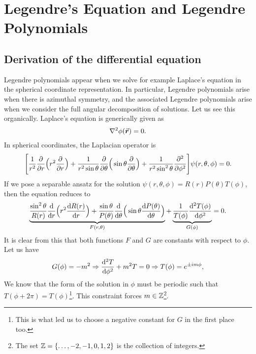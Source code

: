 \chapter{Legendre's Equation and Legendre Polynomials}


\section{Derivation of the differential equation}

Legendre polynomials appear when we solve for example Laplace's equation in the spherical coordinate representation.
In particular, Legendre polynomials arise when there is azimuthal symmetry, and the associated Legendre polynomials arise when we consider the full angular decomposition of solutions.
Let us see this organically.
Laplace's equation is generically given as
\begin{eqnarray}
    \laplacian \phi(\va*{r}) = 0
.\end{eqnarray}
In spherical coordinates, the Laplacian operator is
\begin{eqnarray}
    \Bigg[ \frac{1}{r^2} \pdv{r} \Big( r^2 \pdv{r} \Big) + \frac{1}{r^2 \sin{\theta}} \pdv{\theta} \Big( \sin{\theta} \pdv{\theta} \Big) + \frac{1}{r^2 \sin^2{\theta}} \pdv[2]{\phi} \Bigg] \psi(r,\theta,\phi) = 0
.\end{eqnarray}
If we pose a separable ansatz for the solution $\psi(r,\theta,\phi) = R(r) P(\theta) T(\phi)$, then the equation reduces to
\begin{align}
    \underbrace{ \frac{\sin^2{\theta}}{ R(r)} \dv{r} \Big( r^2 \dv{R(r)}{r} \Big) + \frac{\sin{\theta}}{P(\theta)} \dv{\theta} \Big( \sin{\theta} \dv{P(\theta)}{\theta} \Big) }_{F(r,\theta)} + \underbrace{ \frac{1}{T(\phi)} \dv[2]{T(\phi)}{\phi} }_{G(\phi)} = 0
.\end{align}
It is clear from this that both functions $F$ and $G$ are constants with respect to $\phi$.
Let us have 
\begin{align}
    G(\phi) = -m^2 \Rightarrow \dv[2]{T}{\phi} + m^2 T = 0 \Rightarrow T(\phi) = e^{\pm im\phi}
,\end{align}
We know that the form of the solution in $\phi$ must be periodic such that $T(\phi + 2\pi) = T(\phi)$\footnote{This is what led us to choose a negative constant for $G$ in the first place too.}.
This constraint forces $m \in \mathbb{Z}$\footnote{The set $\mathbb{Z} = \{ \ldots,-2,-1,0,1,2 \}$ is the collection of integers.}.

